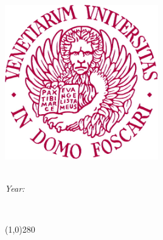 \newcommand{\image}[3]{ %
	\begin{figure}[h!]
		\centering
		\texttt{[image: \#1]} 
		\caption{#2}
	\end{figure}
	\FloatBarrier
}

\newcommand{\imageLabel}[4]{ %
	\begin{figure}[h!]
		\centering
		\texttt{[image: \#1]} 
		\caption{#2}
		\label{fig:#4}
	\end{figure}
	\FloatBarrier
}
\newcommand{\Z}{\mathbb{Z}}

\begin{titlepage}
	\begin{center}
 		\includegraphics[width=0.5\textwidth]{img/unive}
 		\vspace*{1cm}
		
		\LARGE
		\textit{\mycourse \\ \center Year: \mycourseyears}
		
		\vspace{0.5cm}
		\Huge
		\textbf{\mytitle}\\
		\LARGE {\mysubtitle}
		
		\line(1,0){280}
		
		\vspace{0.5cm}
		\large
        \textit{\mydate}
		
		\vfill
		
	\end{center}
	\large
	\myauthor \\
\end{titlepage}


